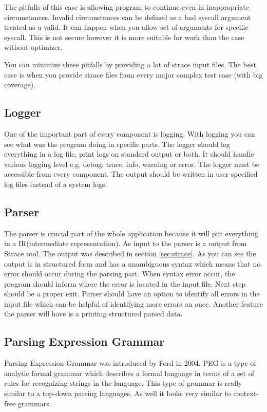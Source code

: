 The pitfalls of this case is allowing program to continue even in inappropriate circumstances.
Invalid circumstances can be defined as a bad syscall argument treated as a valid.
It can happen when you allow set of arguments for specific syscall.
This is not secure however it is more suitable for work than the case without optimizer.

You can minimize these pitfalls by providing a lot of strace input files.
The best case is when you provide strace files from every major complex test case (with big coverage).


\subsection{Logger}
One of the important part of every component is logging.
With logging you can see what was the program doing in specific parts.
The logger should log everything in a log file, print logs on standard output or both.
It should handle various logging level e.g. debug, trace, info, warning or error.
The logger must be accessible from every component.
The output should be written in user specified log files instead of a system logs.


\subsection{Parser}
The parser is crucial part of the whole application because it will put everything in a IR(intermediate representation).
As input to the parser is a output from Strace tool.
The output was described in section \ref{sec:strace}.
As you can see the output is in structured form and has a unambiguous syntax which means that no error should occur during the parsing part.
When syntax error occur, the program should inform where the error is located in the input file.
Next step should be a proper exit.
Parser should have an option to identify all errors in the input file which can be helpful of identifying more errors on once.
Another feature the parser will have is a printing structured parsed data.

\subsection{Parsing Expression Grammar}
Parsing Expression Grammar was introduced by Ford in 2004.
PEG is a type of analytic formal grammar which describes a formal language in terms of a set of rules for recognizing strings in the language.
This type of grammar is really similar to a top-down parsing languages.
As well it looks very similar to context-free grammars.

